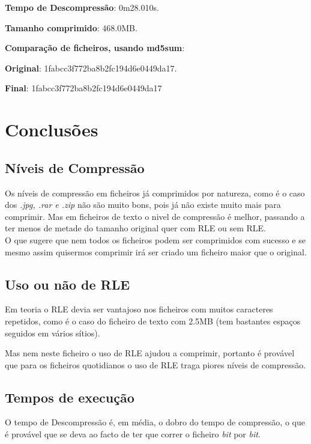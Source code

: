 \documentclass[11pt,a4paper]{report}
\begin{document}
	\textbf{Tempo de Descompressão}: 0m28.010s.

	\textbf{Tamanho comprimido}: 468.0MB.

	\textbf{Comparação de ficheiros, usando md5sum}:

	\textbf{Original}: 1fabcc3f772ba8b2fc194d6e0449da17.

	\textbf{Final}: 1fabcc3f772ba8b2fc194d6e0449da17



\chapter{Conclusões}
\section{Níveis de Compressão}
Os níveis de compressão em ficheiros já comprimidos por natureza, como é o caso dos \textit{.jpg, .rar e .zip} não são muito bons, pois já não existe muito mais para comprimir.
Mas em ficheiros de texto o nivel de compressão é melhor, passando a ter menos de metade do tamanho original quer com RLE ou sem RLE.\\
O que sugere que nem todos os ficheiros podem ser comprimidos com sucesso e se mesmo assim quisermos comprimir irá ser criado um ficheiro maior que o original.

\section{Uso ou não de RLE}
Em teoria o RLE devia ser vantajoso nos ficheiros com muitos caracteres repetidos, como é o caso do ficheiro de texto com 2.5MB (tem bastantes espaços seguidos em vários sítios).

Mas nem neste ficheiro o uso de RLE ajudou a comprimir, portanto é provável que para os ficheiros quotidianos o uso de RLE traga piores níveis de compressão.

\section{Tempos de execução}
\label{sec:Otimizacoes}
O tempo de Descompressão é, em média, o dobro do tempo de compressão, o que é provável que se deva ao facto de ter que correr o ficheiro \textit{bit} por \textit{bit}.
\end{document}
